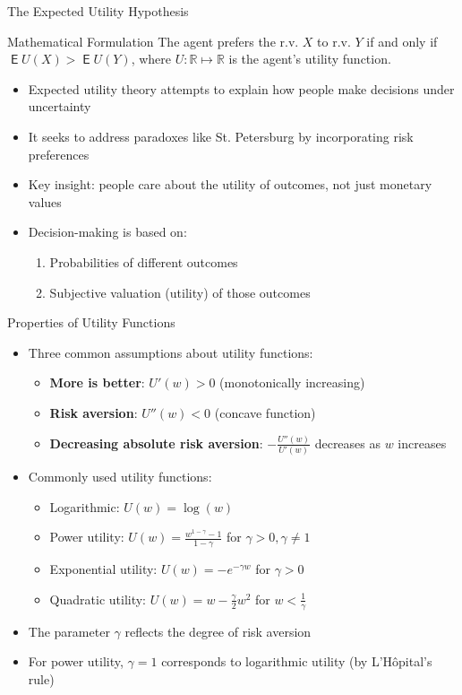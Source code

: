 \documentclass[10pt,handout]{beamer}
\DeclareMathOperator\expc{\mathsf{E}}
\newcommand{\RR}{\mathbb R}
\begin{document}
\begin{frame}{The Expected Utility Hypothesis}
  \begin{block}{Mathematical Formulation}
    The agent prefers the r.v. $X$ to r.v. $Y$ if and only if $\expc U(X) > \expc U(Y)$, where $U:\RR\mapsto\RR$ is the agent's utility function.
  \end{block}
  \vspace{3mm}
  \onslide<+-> 
  \begin{itemize}[<+->]
    \item Expected utility theory attempts to explain how people make decisions under uncertainty
    \item It seeks to address paradoxes like St. Petersburg by incorporating risk preferences
    \item Key insight: people care about the utility of outcomes, not just monetary values
    \item Decision-making is based on:
      \begin{enumerate}
        \item Probabilities of different outcomes
        \item Subjective valuation (utility) of those outcomes
      \end{enumerate}
  \end{itemize}
\end{frame}

\begin{frame}{Properties of Utility Functions}
  \begin{itemize}[<+->]
    \item Three common assumptions about utility functions:
      \begin{itemize}
        \item \textbf{More is better}: $U'(w) > 0$ (monotonically increasing)
        \item \textbf{Risk aversion}: $U''(w) < 0$ (concave function)
        \item \textbf{Decreasing absolute risk aversion}: $-\frac{U''(w)}{U'(w)}$ decreases as $w$ increases
      \end{itemize}
    \item Commonly used utility functions:
      \begin{itemize}
        \item Logarithmic: $U(w) = \log(w)$
        \item Power utility: $U(w) = \frac{w^{1-\gamma} - 1}{1-\gamma}$ for $\gamma > 0, \gamma \neq 1$
        \item Exponential utility: $U(w) = -e^{-\gamma w}$ for $\gamma > 0$
        \item Quadratic utility: $U(w) = w - \frac{\gamma}{2}w^2$ for $w < \frac{1}{\gamma}$
      \end{itemize}
    \item The parameter $\gamma$ reflects the degree of risk aversion
    \item For power utility, $\gamma = 1$ corresponds to logarithmic utility (by L'Hôpital's rule)
  \end{itemize}
\end{frame}
\end{document}
